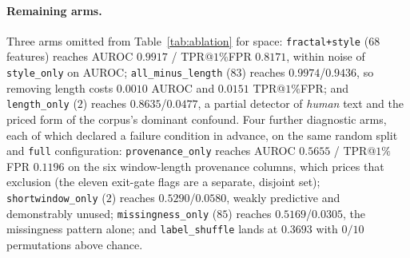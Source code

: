 \documentclass{article}
\newcommand{\arm}[1]{\texttt{#1}}
\begin{document}
\paragraph{Remaining arms.} Three arms omitted from Table~\ref{tab:ablation} for
space: \arm{fractal+style} ($68$ features) reaches AUROC $0.9917$ / TPR@$1\%$FPR
$0.8171$, within noise of \arm{style\_only} on AUROC; \arm{all\_minus\_length}
($83$) reaches $0.9974$/$0.9436$, so removing length costs $0.0010$ AUROC and
$0.0151$ TPR@$1\%$FPR; and \arm{length\_only} ($2$) reaches $0.8635$/$0.0477$, a
partial detector of \emph{human} text and the priced form of the corpus's dominant
confound. Four further diagnostic arms,
each of which declared a failure condition in advance, on the same random split
and \arm{full} configuration: \arm{provenance\_only} reaches
AUROC $0.5655$ / TPR@$1\%$FPR $0.1196$ on the six window-length provenance
columns, which prices that exclusion (the eleven exit-gate flags are a
separate, disjoint set); \arm{shortwindow\_only} ($2$) reaches
$0.5290$/$0.0580$, weakly predictive and demonstrably unused;
\arm{missingness\_only} ($85$) reaches $0.5169$/$0.0305$, the missingness
pattern alone; and \arm{label\_shuffle} lands at $0.3693$ with $0/10$
permutations above chance.
\end{document}
